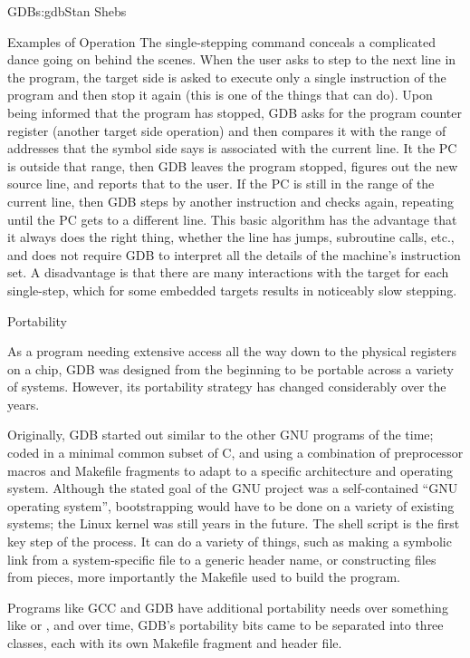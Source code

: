 \begin{aosachapter}{GDB}{s:gdb}{Stan Shebs}
\begin{aosasect1}{Examples of Operation}
The single-stepping command  conceals a complicated dance
going on behind the scenes.  When the user asks to step to the next
line in the program, the target side is asked to execute only a single
instruction of the program and then stop it again (this is one of the
things that  can do).  Upon being informed that the
program has stopped, GDB asks for the program counter register
(another target side operation) and then compares it with the range of
addresses that the symbol side says is associated with the current
line.  It the PC is outside that range, then GDB leaves the program
stopped, figures out the new source line, and reports that to the
user.  If the PC is still in the range of the current line, then GDB
steps by another instruction and checks again, repeating until the PC
gets to a different line.  This basic algorithm has the advantage that
it always does the right thing, whether the line has jumps, subroutine
calls, etc., and does not require GDB to interpret all the details of
the machine's instruction set.  A disadvantage is that there are many
interactions with the target for each single-step, which for some
embedded targets results in noticeably slow stepping.

\end{aosasect1}

\begin{aosasect1}{Portability}

As a program needing extensive access all the way down to the physical
registers on a chip, GDB was designed from the beginning to be
portable across a variety of systems.  However, its portability
strategy has changed considerably over the years.

Originally, GDB started out similar to the other GNU programs of the
time; coded in a minimal common subset of C, and using a combination
of preprocessor macros and Makefile fragments to adapt to a specific
architecture and operating system.  Although the stated goal of the
GNU project was a self-contained ``GNU operating system'',
bootstrapping would have to be done on a variety of existing systems;
the Linux kernel was still years in the future.  The 
shell script is the first key step of the process.  It can do a
variety of things, such as making a symbolic link from a
system-specific file to a generic header name, or constructing files
from pieces, more importantly the Makefile used to build the program.

Programs like GCC and GDB have additional portability needs over
something like  or , and over time, GDB's
portability bits came to be separated into three classes, each with
its own Makefile fragment and header file.


\end{aosasect1}
\end{aosachapter}
